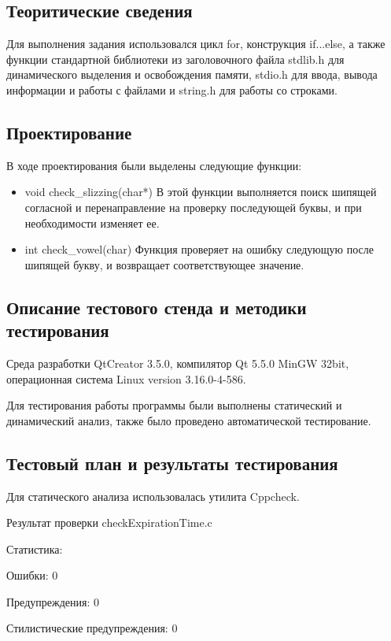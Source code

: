 \documentclass[12pt,a4paper]{report}
\begin{document}
\subsection{Теоритические сведения}

Для выполнения задания использовался цикл for, конструкция if...else, а также функции стандартной библиотеки из заголовочного файла stdlib.h для динамического выделения и освобождения памяти, stdio.h для ввода, вывода информации и работы с файлами и string.h для работы со строками. 

\subsection{Проектирование}

В ходе проектирования были выделены следующие функции:
\begin{itemize}
	 \item void check_slizzing(char*)
 	В этой функции выполняется поиск шипящей согласной и перенаправление на проверку последующей буквы, и при необходимости изменяет ее.
 	
 	\item int check_vowel(char)
 	Функция проверяет на ошибку следующую после шипящей букву, и возвращает соответствующее значение.
\end{itemize}
	
	
\subsection{Описание тестового стенда и методики тестирования}
Среда разработки QtCreator 3.5.0, компилятор Qt 5.5.0 MinGW 32bit, операционная система Linux version 3.16.0-4-586.

Для тестирования работы программы были выполнены статический и динамический анализ, также было проведено автоматической тестирование.
\subsection{Тестовый план и результаты тестирования}

Для статического анализа использовалась утилита Cppcheck.

\vspace{\baselineskip}
Результат проверки checkExpirationTime.c 

Статистика:

Ошибки:	0

Предупреждения:	0

Стилистические предупреждения:	0
\end{document}
